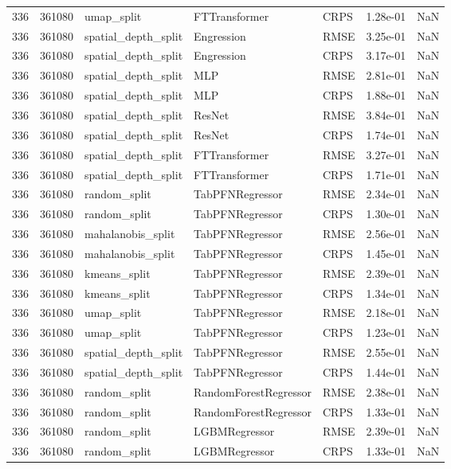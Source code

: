 \begin{tabular}{rrlllrr}
336 & 361080 & umap\_split & FTTransformer & CRPS & 1.28e-01 & NaN \\
336 & 361080 & spatial\_depth\_split & Engression & RMSE & 3.25e-01 & NaN \\
336 & 361080 & spatial\_depth\_split & Engression & CRPS & 3.17e-01 & NaN \\
336 & 361080 & spatial\_depth\_split & MLP & RMSE & 2.81e-01 & NaN \\
336 & 361080 & spatial\_depth\_split & MLP & CRPS & 1.88e-01 & NaN \\
336 & 361080 & spatial\_depth\_split & ResNet & RMSE & 3.84e-01 & NaN \\
336 & 361080 & spatial\_depth\_split & ResNet & CRPS & 1.74e-01 & NaN \\
336 & 361080 & spatial\_depth\_split & FTTransformer & RMSE & 3.27e-01 & NaN \\
336 & 361080 & spatial\_depth\_split & FTTransformer & CRPS & 1.71e-01 & NaN \\
336 & 361080 & random\_split & TabPFNRegressor & RMSE & 2.34e-01 & NaN \\
336 & 361080 & random\_split & TabPFNRegressor & CRPS & 1.30e-01 & NaN \\
336 & 361080 & mahalanobis\_split & TabPFNRegressor & RMSE & 2.56e-01 & NaN \\
336 & 361080 & mahalanobis\_split & TabPFNRegressor & CRPS & 1.45e-01 & NaN \\
336 & 361080 & kmeans\_split & TabPFNRegressor & RMSE & 2.39e-01 & NaN \\
336 & 361080 & kmeans\_split & TabPFNRegressor & CRPS & 1.34e-01 & NaN \\
336 & 361080 & umap\_split & TabPFNRegressor & RMSE & 2.18e-01 & NaN \\
336 & 361080 & umap\_split & TabPFNRegressor & CRPS & 1.23e-01 & NaN \\
336 & 361080 & spatial\_depth\_split & TabPFNRegressor & RMSE & 2.55e-01 & NaN \\
336 & 361080 & spatial\_depth\_split & TabPFNRegressor & CRPS & 1.44e-01 & NaN \\
336 & 361080 & random\_split & RandomForestRegressor & RMSE & 2.38e-01 & NaN \\
336 & 361080 & random\_split & RandomForestRegressor & CRPS & 1.33e-01 & NaN \\
336 & 361080 & random\_split & LGBMRegressor & RMSE & 2.39e-01 & NaN \\
336 & 361080 & random\_split & LGBMRegressor & CRPS & 1.33e-01 & NaN \\

\end{tabular}
